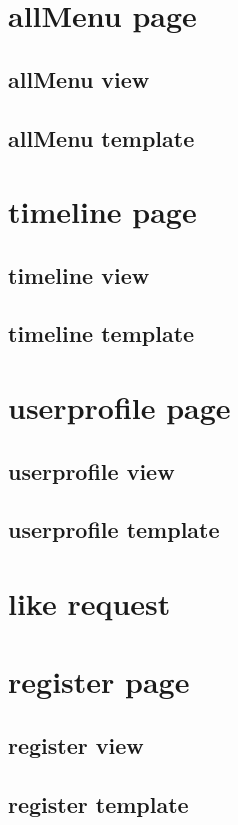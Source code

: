 \section{allMenu page}
\subsection{allMenu view}
\subsection{allMenu template}

\section{timeline page}
\subsection{timeline view}
\subsection{timeline template}

\section{userprofile page}
\subsection{userprofile view}
\subsection{userprofile template}

\section{like request}

\section{register page}
\subsection{register view}
\subsection{register template}

